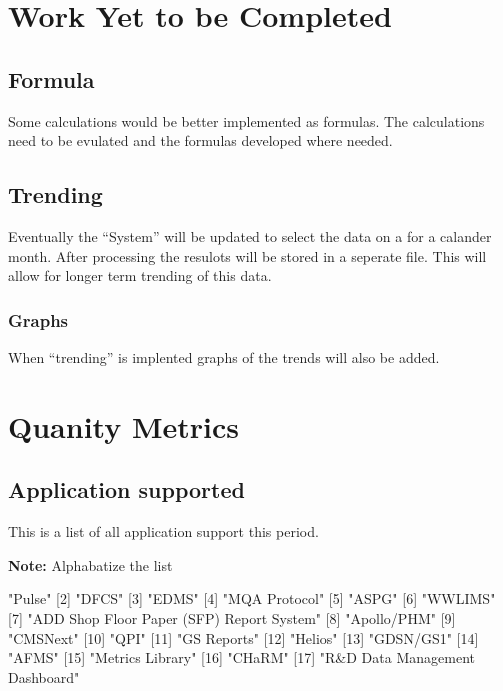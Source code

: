 \documentclass{article}
\begin{document}
\section{Work Yet to be Completed}
\subsection{Formula}
Some calculations would be better implemented as formulas. The calculations need
to be evulated and the formulas developed where needed.
\subsection{Trending}
Eventually the ``System'' will be updated to select the data on a for a calander
month. After processing the resulots will be stored in a seperate file.
This will allow for longer term trending of this data.
\subsubsection{Graphs}
When ``trending'' is implented graphs of the trends will also be added.


\section{Quanity Metrics}
\subsection{Application supported}
This is a list of all application support this period.

\textbf{Note:} Alphabatize the list

\begin{Schunk}
\begin{Soutput}
 [1] "Pulse"                                   
 [2] "DFCS"                                    
 [3] "EDMS"                                    
 [4] "MQA Protocol"                            
 [5] "ASPG"                                    
 [6] "WWLIMS"                                  
 [7] "ADD Shop Floor Paper (SFP) Report System"
 [8] "Apollo/PHM"                              
 [9] "CMSNext"                                 
[10] "QPI"                                     
[11] "GS Reports"                              
[12] "Helios"                                  
[13] "GDSN/GS1"                                
[14] "AFMS"                                    
[15] "Metrics Library"                         
[16] "CHaRM"                                   
[17] "R&D Data Management Dashboard"           
\end{Soutput}
\end{Schunk}
\end{document}
